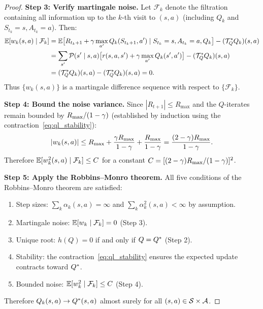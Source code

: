 \documentclass[11pt,a4paper]{article}
\begin{document}
\begin{proof}
\textbf{Step 3: Verify martingale noise.}
Let $\mathcal{F}_k$ denote the filtration containing all information
up to the $k$-th visit to $(s,a)$ (including $Q_k$ and
$S_{t_k} = s, A_{t_k} = a$). Then:
\begin{align}
  \mathbb{E}[w_k(s,a) \mid \mathcal{F}_k]
  &= \mathbb{E}\bigl[R_{t_k+1} + \gamma \max_{a'} Q_k(S_{t_k+1}, a')
     \mid S_{t_k} = s, A_{t_k} = a, Q_k\bigr]
     - (\mathcal{T}^*_Q Q_k)(s,a) \nonumber\\
  &= \sum_{s'} \mathcal{P}(s' \mid s,a)
     \bigl[r(s,a,s') + \gamma \max_{a'} Q_k(s',a')\bigr]
     - (\mathcal{T}^*_Q Q_k)(s,a) \nonumber\\
  &= (\mathcal{T}^*_Q Q_k)(s,a) - (\mathcal{T}^*_Q Q_k)(s,a)
   = 0.
  \label{eq:ql_noise_mg}
\end{align}
Thus $\{w_k(s,a)\}$ is a martingale difference sequence with respect
to $\{\mathcal{F}_k\}$.

\textbf{Step 4: Bound the noise variance.}
Since $|R_{t+1}| \leq R_{\max}$ and the $Q$-iterates remain bounded
by $R_{\max}/(1-\gamma)$ (established by induction using the
contraction~\eqref{eq:ql_stability}):
\begin{equation}
  |w_k(s,a)| \leq R_{\max} + \frac{\gamma R_{\max}}{1-\gamma}
  + \frac{R_{\max}}{1-\gamma}
  = \frac{(2-\gamma)R_{\max}}{1-\gamma}.
  \label{eq:ql_noise_bound}
\end{equation}
Therefore $\mathbb{E}[w_k^2(s,a) \mid \mathcal{F}_k] \leq C$ for a
constant $C = [(2-\gamma)R_{\max}/(1-\gamma)]^2$.

\textbf{Step 5: Apply the Robbins--Monro theorem.}
All five conditions of the Robbins--Monro theorem are satisfied:
\begin{enumerate}[nosep]
  \item Step sizes: $\sum_k \alpha_k(s,a) = \infty$ and
    $\sum_k \alpha_k^2(s,a) < \infty$ by assumption.
  \item Martingale noise: $\mathbb{E}[w_k \mid \mathcal{F}_k] = 0$
    (Step 3).
  \item Unique root: $h(Q) = 0$ if and only if $Q = Q^*$
    (Step 2).
  \item Stability: the contraction~\eqref{eq:ql_stability}
    ensures the expected update contracts toward $Q^*$.
  \item Bounded noise: $\mathbb{E}[w_k^2 \mid \mathcal{F}_k] \leq C$
    (Step 4).
\end{enumerate}
Therefore $Q_k(s,a) \to Q^*(s,a)$ almost surely for all
$(s,a) \in \mathcal{S} \times \mathcal{A}$.
\end{proof}
\end{document}
